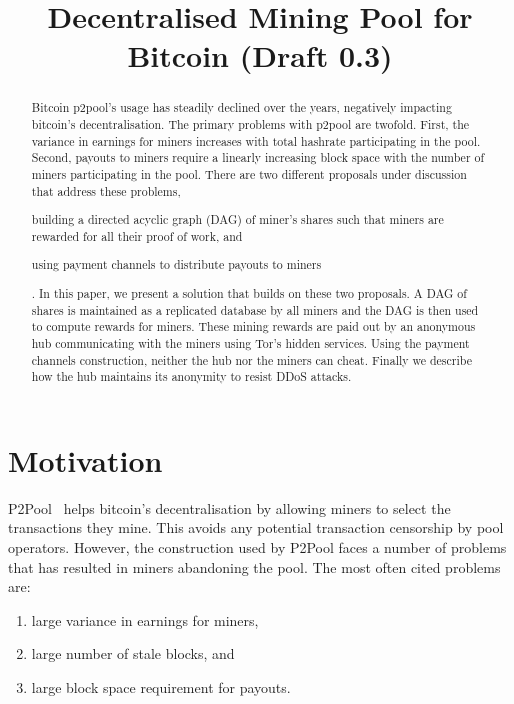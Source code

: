 \documentclass{article}
\title{Decentralised Mining Pool for Bitcoin (Draft 0.3)}
\author{}
\date{}
\begin{document}
\maketitle

\begin{abstract}
  Bitcoin p2pool's usage has steadily declined over the years,
  negatively impacting bitcoin's decentralisation. The primary
  problems with p2pool are twofold. First, the variance in earnings
  for miners increases with total hashrate participating in the
  pool. Second, payouts to miners require a linearly increasing block
  space with the number of miners participating in the pool. There are
  two different proposals under discussion that address these
  problems,
  \begin{enumerate*}[label=(\roman*)]
  \item building a directed acyclic graph (DAG) of miner's shares such
    that miners are rewarded for all their proof of work, and
  \item  using payment channels to distribute payouts to miners
  \end{enumerate*}. In this paper, we present a solution that builds
  on these two proposals. A DAG of shares is maintained as a
  replicated database by all miners and the DAG is then used to
  compute rewards for miners. These mining rewards are paid out by an
  anonymous hub communicating with the miners using Tor's hidden
  services. Using the payment channels construction, neither the hub
  nor the miners can cheat. Finally we describe how the hub maintains
  its anonymity to resist DDoS attacks.
\end{abstract}
   
\section{Motivation}

P2Pool~\cite{p2pool:wiki} helps bitcoin's decentralisation by allowing
miners to select the transactions they mine. This avoids any potential
transaction censorship by pool operators. However, the construction
used by P2Pool faces a number of problems that has resulted in miners
abandoning the pool. The most often cited problems are:

\begin{enumerate}
\item large variance in earnings for miners,
\item large number of stale blocks, and
\item large block space requirement for payouts.
\end{enumerate}
\end{document}
